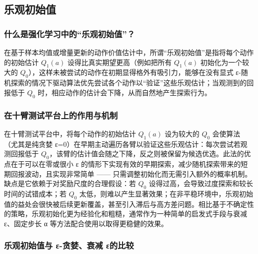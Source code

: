 \documentclass[11pt]{ctexart}
\begin{document}
    \hypertarget{ux4e50ux89c2ux521dux59cbux503c}{%
\subsection{乐观初始值}\label{ux4e50ux89c2ux521dux59cbux503c}}

\hypertarget{ux4ec0ux4e48ux662fux5f3aux5316ux5b66ux4e60ux4e2dux7684ux4e50ux89c2ux521dux59cbux503c}{%
\subsubsection{什么是强化学习中的``乐观初始值''？}\label{ux4ec0ux4e48ux662fux5f3aux5316ux5b66ux4e60ux4e2dux7684ux4e50ux89c2ux521dux59cbux503c}}

在基于样本均值或增量更新的动作价值估计中，所谓``乐观初始值''是指将每个动作的初始估计
\(Q_1(a)\) 设得比真实期望更高（例如把所有 \(Q_1(a)\) 初始化为一个较大的
\(Q_0\)），这样未被尝试的动作在初期显得格外有吸引力，能够在没有显式
ε-随机探索的情况下驱动算法优先尝试各个动作以``验证''这些乐观估计；当观测到的回报低于
\(Q_0\) 时，相应动作的估计会下降，从而自然地产生探索行为。

\hypertarget{ux5728ux5341ux81c2ux6d4bux8bd5ux5e73ux53f0ux4e0aux7684ux4f5cux7528ux4e0eux673aux5236}{%
\subsubsection{在十臂测试平台上的作用与机制}\label{ux5728ux5341ux81c2ux6d4bux8bd5ux5e73ux53f0ux4e0aux7684ux4f5cux7528ux4e0eux673aux5236}}

在十臂测试平台中，将每个动作的初始估计 \(Q_1(a)\) 设为较大的 \(Q_0\)
会使算法（尤其是纯贪婪
ε=0）在早期主动遍历各臂以验证这些乐观估计：每次尝试若观测回报低于
\(Q_0\)，该臂的估计值会随之下降，反之则被保留为候选优选。此法的优点在于可以在零或很小
ε
的情形下实现有效的早期探索，减少随机探索带来的短期回报波动，且实现非常简单
------
只需调整初始化而无需引入额外的概率机制。缺点是它依赖于对奖励尺度的合理假设：若
\(Q_0\) 设得过高，会导致过度探索和较长时间的试错成本；若 \(Q_0\)
太低，则难以产生显著效果；在非平稳环境中，乐观初始值的益处会很快被后续更新覆盖，甚至引入滞后与高方差问题。相比基于不确定性的策略，乐观初始化更为经验化和粗糙，通常作为一种简单的启发式手段与衰减
ε、固定步长 α 等方法配合使用以取得更稳健的效果。

\hypertarget{ux4e50ux89c2ux521dux59cbux503cux4e0e-ux3b5-ux8d2aux5a6aux8870ux51cf-ux3b5ux7684ux6bd4ux8f83}{%
\subsubsection{乐观初始值与 ε-贪婪、衰减
ε的比较}\label{ux4e50ux89c2ux521dux59cbux503cux4e0e-ux3b5-ux8d2aux5a6aux8870ux51cf-ux3b5ux7684ux6bd4ux8f83}}
\end{document}
